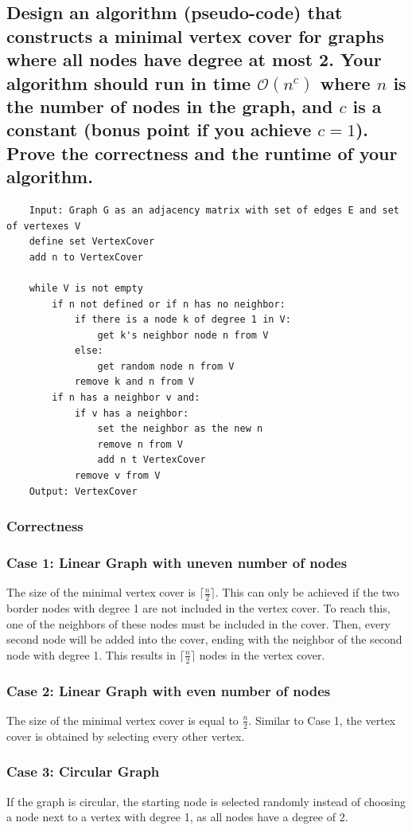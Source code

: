 \documentclass[runningheads]{llncs}
\begin{document}
\newpage
\subsection*{Design an algorithm (pseudo-code) that constructs a minimal vertex cover for graphs where all nodes have degree at most 2. Your algorithm should run in time $\mathcal{O}(n^c)$ where $n$ is the number of nodes in the graph, and $c$ is a constant (bonus point if you achieve $c = 1$). Prove the correctness and the runtime of your algorithm.}
\begin{verbatim}
    Input: Graph G as an adjacency matrix with set of edges E and set of vertexes V
    define set VertexCover
    add n to VertexCover

    while V is not empty
        if n not defined or if n has no neighbor:
            if there is a node k of degree 1 in V:
                get k's neighbor node n from V
            else:
                get random node n from V
            remove k and n from V
        if n has a neighbor v and:
            if v has a neighbor:
                set the neighbor as the new n
                remove n from V
                add n t VertexCover
            remove v from V
    Output: VertexCover
\end{verbatim}

\subsubsection*{Correctness}
\subsubsection*{Case 1: Linear Graph with uneven number of nodes} The size of the minimal vertex cover is $\lceil\frac{n}{2}\rceil$. This can only be achieved if
the two border nodes with degree 1 are not included in the vertex cover. To reach this, one of the neighbors of these nodes must be included in the cover. Then, every second node
will be added into the cover, ending with the neighbor of the second node with degree 1. This results in $\lceil\frac{n}{2}\rceil$ nodes in the vertex cover.
\subsubsection*{Case 2: Linear Graph with even number of nodes} The size of the minimal vertex cover is equal to $\frac{n}{2}$. Similar to Case 1, the vertex cover is obtained by selecting
every other vertex.
\subsubsection*{Case 3: Circular Graph} If the graph is circular, the starting node is selected randomly instead of choosing a node next to a vertex with degree 1, as all nodes have a degree of 2.
\end{document}
